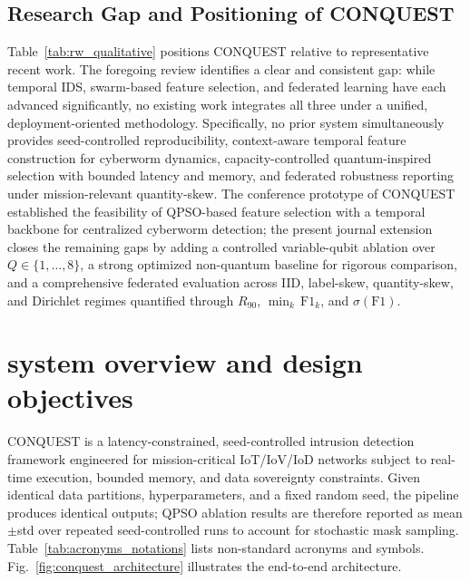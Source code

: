 \documentclass[conference]{IEEEtran}
\begin{document}
\subsection{Research Gap and Positioning of CONQUEST}

Table~\ref{tab:rw_qualitative} positions CONQUEST relative to
representative recent work. The foregoing review identifies a clear
and consistent gap: while temporal IDS, swarm-based feature
selection, and federated learning have each advanced significantly,
no existing work integrates all three under a unified,
deployment-oriented methodology. Specifically, no prior system
simultaneously provides seed-controlled reproducibility, context-aware
temporal feature construction for cyberworm dynamics,
capacity-controlled quantum-inspired selection with bounded latency
and memory, and federated robustness reporting under mission-relevant
quantity-skew. The conference prototype of
CONQUEST~\cite{ajakweconquest} established the feasibility of
QPSO-based feature selection with a temporal backbone for centralized
cyberworm detection; the present journal extension closes the
remaining gaps by adding a controlled variable-qubit ablation over
$Q\in\{1,\dots,8\}$, a strong optimized non-quantum baseline for
rigorous comparison, and a comprehensive federated evaluation across
IID, label-skew, quantity-skew, and Dirichlet regimes quantified
through $R_{90}$, $\min_k\,\mathrm{F1}_k$, and $\sigma(\mathrm{F1})$.





\section{\textbf{system overview and design objectives}}
\label{sec:conquest_overview}

CONQUEST is a latency-constrained, seed-controlled intrusion
detection framework engineered for mission-critical IoT/IoV/IoD
networks subject to real-time execution, bounded memory, and data
sovereignty constraints. Given identical data partitions,
hyperparameters, and a fixed random seed, the pipeline produces
identical outputs; QPSO ablation results are therefore reported as
mean$\pm$std over repeated seed-controlled runs to account for
stochastic mask sampling. Table~\ref{tab:acronyms_notations}
lists non-standard acronyms and symbols. Fig.~\ref{fig:conquest_architecture}
illustrates the end-to-end architecture.
\end{document}
